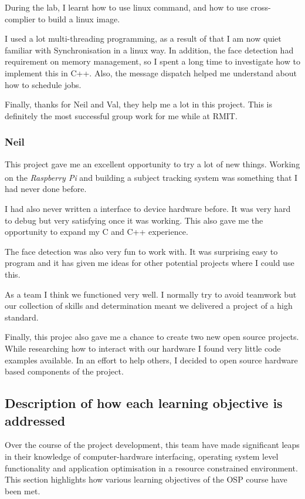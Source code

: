 \documentclass[11pt,a4paper,titlepage]{report}
\newcommand{\rpi}{\textit{Raspberry Pi\textsuperscript{\textregistered}}}
\begin{document}
During the lab, I learnt how to use linux command, and how to use cross-complier to build a linux image.

I used a lot multi-threading programming, as a result of that I am now quiet familiar with Synchronisation in a linux way. In addition, the face detection had requirement on memory management, so I spent a long time to investigate how to implement this in C++. Also, the message dispatch helped me understand about how to schedule jobs.

Finally, thanks for Neil and Val, they help me a lot in this project. This is definitely the most successful group work for me while at RMIT.


\subsubsection{Neil}

This project gave me an excellent opportunity to try a lot of new things. Working on the \rpi\xspace and building a subject tracking system was something that I had never done before.


I had also never written a interface to device hardware before. It was very hard to debug but very satisfying once it was working. This also gave me the opportunity to expand my C and C++ experience.

The face detection was also very fun to work with. It was surprising easy to program and it has given me ideas for other potential projects where I could use this.


As a team I think we functioned very well. I normally try to avoid teamwork but our collection of skills and determination meant we delivered a project of a high standard.


Finally, this projec also gave me a chance to create two new open source projects. While researching how to interact with our hardware I found very little code examples available. In an effort to help others, I decided to open source hardware based components of the project.


\subsection{Description of how each learning objective is addressed}


Over the course of the project development, this team have made significant leaps in their knowledge of computer-hardware interfacing, operating system level functionality and application optimisation in a resource constrained environment. This section highlights how various learning objectives of the OSP course have been met.
 
\end{document}
